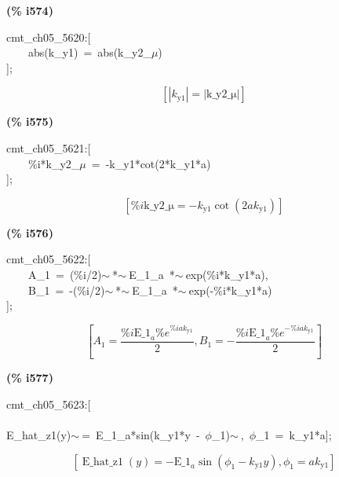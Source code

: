 \documentclass[fleqn]{article}
\begin{document}
\noindent
\begin{minipage}[t]{4.000000em}\color{red}\bfseries
(\% i574)	
\end{minipage}
\begin{minipage}[t]{\textwidth}\color{blue}
cmt\_ch05\_5620:[\\
\ \ \ \ abs(k\_y1)\ =\ abs(k\_y2\_\ensuremath{\mu})\\
];
\end{minipage}
\[\displaystyle \tag{\% o574} 
\left[ \left| {k_{\ensuremath{\mathrm{y1}}}}\right| =\left| \ensuremath{\mathrm{k\_ y2\_ \mu }}\right| \right] \mbox{}
\]


\noindent
\begin{minipage}[t]{4.000000em}\color{red}\bfseries
(\% i575)	
\end{minipage}
\begin{minipage}[t]{\textwidth}\color{blue}
cmt\_ch05\_5621:[\\
\ \ \ \ \%i*k\_y2\_\ensuremath{\mu}\ =\ -k\_y1*cot(2*k\_y1*a)\\
];
\end{minipage}
\[\displaystyle \tag{\% o575} 
\left[ \% i \ensuremath{\mathrm{k\_ y2\_ \mu }}=-{k_{\ensuremath{\mathrm{y1}}}} \cot{\left( 2 a {k_{\ensuremath{\mathrm{y1}}}}\right) }\right] \mbox{}
\]


\noindent
\begin{minipage}[t]{4.000000em}\color{red}\bfseries
(\% i576)	
\end{minipage}
\begin{minipage}[t]{\textwidth}\color{blue}
cmt\_ch05\_5622:[\\
\ \ \ \ A\_1\ =\ (\%i/2)\ensuremath{\sim\ }*\ensuremath{\sim\ }E\_1\_a\ *\ensuremath{\sim\ }exp(\%i*k\_y1*a),\\
\ \ \ \ B\_1\ =\ -(\%i/2)\ensuremath{\sim\ }*\ensuremath{\sim\ }E\_1\_a\ *\ensuremath{\sim\ }exp(-\%i*k\_y1*a)\\
];
\end{minipage}
\[\displaystyle \tag{\% o576} 
\left[ {A_1}=\frac{\% i {{\ensuremath{\mathrm{E\_ 1}}}_a} {{\% e}^{\% i a {k_{\ensuremath{\mathrm{y1}}}}}}}{2}\operatorname{,}{B_1}=-\frac{\% i {{\ensuremath{\mathrm{E\_ 1}}}_a} {{\% e}^{-\% i a {k_{\ensuremath{\mathrm{y1}}}}}}}{2}\right] \mbox{}
\]


\noindent
\begin{minipage}[t]{4.000000em}\color{red}\bfseries
(\% i577)	
\end{minipage}
\begin{minipage}[t]{\textwidth}\color{blue}
cmt\_ch05\_5623:[\\
\\
E\_hat\_z1(y)\ensuremath{\sim\ }=\ E\_1\_a*sin(k\_y1*y\ -\ \ensuremath{\phi}\_1)\ensuremath{\sim\ },\ \ensuremath{\phi}\_1\ =\ k\_y1*a];
\end{minipage}
\[\displaystyle \tag{\% o577} 
\left[ \operatorname{E\_ hat\_ z1}(y)=-{{\ensuremath{\mathrm{E\_ 1}}}_a} \sin{\left( {{\phi }_1}-{k_{\ensuremath{\mathrm{y1}}}} y\right) }\operatorname{,}{{\phi }_1}=a {k_{\ensuremath{\mathrm{y1}}}}\right] \mbox{}
\]
\end{document}
